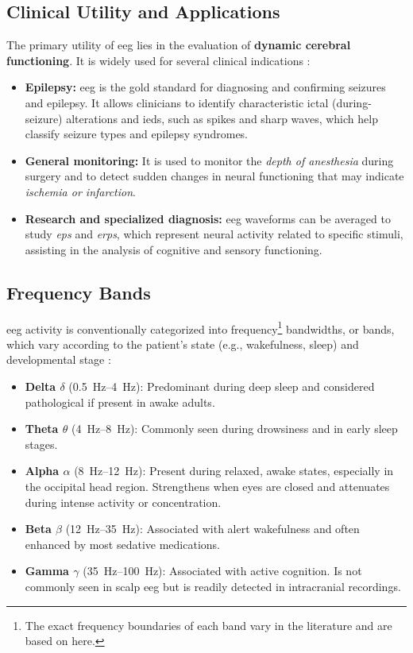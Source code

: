 \subsection{Clinical Utility and Applications}
The primary utility of \gls{eeg} lies in the evaluation of \textbf{dynamic cerebral functioning}. 
It is widely used for several clinical indications \parencite{st_louis_electroencephalography_2016}:
\begin{itemize}
    \item \textbf{Epilepsy:} \gls{eeg} is the gold standard for diagnosing and confirming seizures and epilepsy. 
    It allows clinicians to identify characteristic ictal (during-seizure) alterations and \glspl{ied}, such as spikes and sharp waves, which help classify seizure types and epilepsy syndromes.
    \item \textbf{General monitoring:} It is used to monitor the \textit{depth of anesthesia} during surgery and to detect sudden changes in neural functioning that may indicate \textit{ischemia or infarction}.
    \item \textbf{Research and specialized diagnosis:} \gls{eeg} waveforms can be averaged to study \textit{\glspl{ep}} and \textit{\glspl{erp}}, which represent neural activity related to specific stimuli, assisting in the analysis of cognitive and sensory functioning.
\end{itemize}

\subsection{Frequency Bands}
\gls{eeg} activity is conventionally categorized into frequency\footnote{The exact frequency boundaries of each band vary in the literature and are based on \textcite{mormann_seizure_2007} here.} bandwidths, or bands, which vary according to the patient's state (e.g., wakefulness, sleep) and developmental stage \parencite{st_louis_electroencephalography_2016, mormann_seizure_2007, nayak_normal_2026}:

{
\begin{itemize}
    \item \textbf{Delta $\delta$} (\SIrange{0.5}{4}{\hertz}): Predominant during deep sleep and considered pathological if present in awake adults.
    \item \textbf{Theta $\theta$} (\SIrange{4}{8}{\hertz}): Commonly seen during drowsiness and in early sleep stages.
    \item \textbf{Alpha $\alpha$} (\SIrange{8}{12}{\hertz}): Present during relaxed, awake states, especially in the occipital head region. Strengthens when eyes are closed and attenuates during intense activity or concentration.
    \item \textbf{Beta $\beta$} (\SIrange{12}{35}{\hertz}): Associated with alert wakefulness and often enhanced by most sedative medications.
    \item \textbf{Gamma $\gamma$} (\SIrange{35}{100}{\hertz}): Associated with active cognition. Is not commonly seen in scalp \gls{eeg} but is readily detected in intracranial recordings.
\end{itemize}
}


